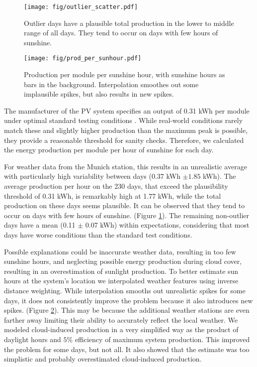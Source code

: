 \documentclass{article}
\begin{document}
\begin{figure}[H]
	\texttt{[image: fig/outlier\_scatter.pdf]}
	\caption{Outlier days have a plausible total production in the lower to middle range of all days. They tend to occur on days with few hours of sunshine.}\label{fig:outlier_scatter}
\end{figure}
\begin{figure}[H]
	\texttt{[image: fig/prod\_per\_sunhour.pdf]}
	\caption{Production per module per sunshine hour, with sunshine hours as bars in the background. Interpolation smoothes out some implausible spikes, but also results in new spikes.}\label{fig:prod_per_hour}
\end{figure}

The manufacturer of the PV system specifies an output of 0.31 kWh per module under optimal standard testing conditions \citep{MonoSol}. While real-world conditions rarely match these and slightly higher production than the maximum peak is possible, they provide a reasonable threshold for sanity checks. Therefore, we calculated the energy production per module per hour of sunshine for each day.

For weather data from the Munich station, this results in an unrealistic average with particularly high variability between days ($0.37$ kWh $\pm 1.85$ kWh). The average production per hour on the 230 days, that exceed the plausibility threshold of 0.31 kWh, is remarkably high at 1.77 kWh, while the total production on these days seems plausible. It can be observed that they tend to occur on days with few hours of sunshine. (Figure \ref{fig:outlier_scatter}).  The remaining non-outlier days have a mean (0.11 $\pm$ 0.07 kWh) within expectations, considering that most days have worse conditions than the standard test conditions. 

Possible explanations could be inaccurate weather data, resulting in too few sunshine hours, and neglecting possible energy production during cloud cover, resulting in an overestimation of sunlight production. To better estimate sun hours at the system's location we interpolated weather features using inverse distance weighting. While interpolation smooths out unrealistic spikes for some days, it does not consistently improve the problem because it also introduces new spikes. (Figure \ref{fig:prod_per_hour}). This may be because the additional weather stations are even farther away limiting their ability to accurately reflect the local weather. We modeled cloud-induced production in a very simplified way as the product of daylight hours and $5\%$ efficiency of maximum system production. This improved the problem for some days, but not all. It also showed that the estimate was too simplistic and probably overestimated cloud-induced production.
\end{document}
